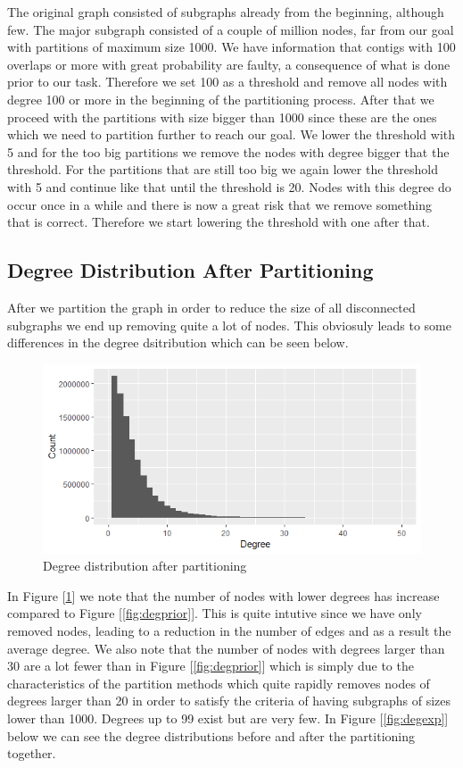 \documentclass[a4paper,10pt]{article}
\newcommand\bref[1]{[\ref{#1}]}
\begin{document}
The original graph consisted of subgraphs already from the beginning, although few. The major subgraph consisted of a couple of million
nodes, far from our goal with partitions of maximum size 1000. We have information that contigs with 100 overlaps or more with great
probability are faulty, a consequence of what is done prior to our task. Therefore we set 100 as a threshold and remove all nodes with
degree 100 or more in the beginning of the partitioning process. After that we proceed with the partitions with size bigger than 1000
since these are the ones which we need to partition further to reach our goal. We lower the threshold with 5 and for the too big
partitions we remove the nodes with degree bigger that the threshold. For the partitions that are still too big we again lower the
threshold with 5 and continue like that until the threshold is 20. Nodes with this degree do occur once in a while and there is now a
great risk that we remove something that is correct. Therefore we start lowering the threshold with one after that.



\subsection{Degree Distribution After Partitioning}

After we partition the graph in order to reduce the size of all disconnected subgraphs we end up removing quite a lot of nodes. This obviosuly leads to some differences in the degree dsitribution which can be seen below.

\begin{figure}[H]
	\centering
	\includegraphics[width=0.85\linewidth]{degreesafter.png}
	\caption{Degree distribution after partitioning}
	\label{fig:degafter}
\end{figure}

In Figure \bref{fig:degafter} we note that the number of nodes with lower degrees has increase compared to Figure \bref{fig:degprior}. This is quite intutive since we have only removed nodes, leading to a reduction in the number of edges and as a result the average degree. We also note that the number of nodes with degrees larger than 30 are a lot fewer than in Figure \bref{fig:degprior} which is simply due to the characteristics of the partition methods which quite rapidly removes nodes of degrees larger than 20 in order to satisfy the criteria of having subgraphs of sizes lower than 1000. Degrees up to 99 exist but are very few. In Figure \bref{fig:degexp} below we can see the degree distributions before and after the partitioning together.
\end{document}
